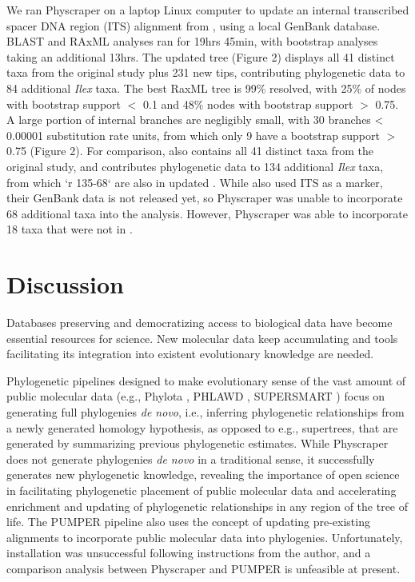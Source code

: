 \documentclass{bmcart}
\begin{document}
We ran Physcraper on a laptop Linux computer to update an internal transcribed
spacer DNA region (ITS) alignment from \cite{gottlieb2005molecular}, using a local
GenBank database.  BLAST and RAxML analyses ran for 19hrs 45min, with bootstrap
analyses taking an additional 13hrs.
The updated \cite{gottlieb2005molecular} tree (Figure 2) displays
all 41 distinct
taxa from the original study plus 231 new tips, contributing phylogenetic data to
84 additional \textit{Ilex} taxa. The best RaxML tree is 99\% resolved, with 25\% of nodes
with bootstrap support $<$ 0.1 and 48\% nodes with bootstrap support $>$ 0.75.
A large portion of internal branches are negligibly small, with 30 branches
< 0.00001 substitution rate units, from which only 9 have a bootstrap support $>$ 0.75
(Figure 2).
For comparison, \cite{yao2020phylogeny} also contains all 41 distinct taxa from
the original
\cite{gottlieb2005molecular} study,
and contributes phylogenetic data to 134 additional \textit{Ilex} taxa, from which
`r 135-68` are also in updated \cite{gottlieb2005molecular}. While \cite{yao2020phylogeny} also used
ITS as a marker, their GenBank data is not released yet, so Physcraper was unable
to incorporate 68 additional taxa into the analysis. However, Physcraper was able
to incorporate 18 taxa that were not in \cite{yao2020phylogeny}.

\section*{Discussion}

Databases preserving and democratizing access to biological data
have become essential resources for science.
New molecular data keep accumulating and tools facilitating its integration into
existent evolutionary knowledge are needed.

Phylogenetic pipelines designed to make evolutionary sense of the vast amount of
public molecular data (e.g., Phylota \cite{sanderson2008phylota},
PHLAWD \cite{smith2009mega},
SUPERSMART \cite{antonelli2017toward}) focus on generating full phylogenies \textit{de novo},
i.e., inferring phylogenetic relationships from a newly generated homology hypothesis,
as opposed to e.g., supertrees, that are generated by summarizing previous
phylogenetic estimates.
While Physcraper does not generate phylogenies \textit{de novo} in a traditional sense,
it successfully generates new phylogenetic knowledge, revealing the importance of
open science in facilitating phylogenetic placement of public molecular data and
accelerating enrichment and updating of phylogenetic relationships in any region
of the tree of life.
The PUMPER pipeline \cite{izquierdo2014pumper} also uses the concept of updating
pre-existing alignments to incorporate public molecular data into phylogenies.
Unfortunately, installation was unsuccessful following instructions from the author,
and a comparison analysis between Physcraper and PUMPER is unfeasible at present.
\end{document}
